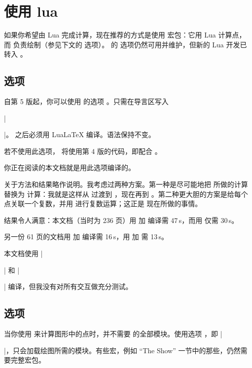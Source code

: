 \newpage
\section{使用 lua} \label{calc_with_lua}

如果你希望由 Lua 完成计算，现在推荐的方式是使用  宏包：它用 Lua 计算点，而 \tkzname{\tkznameofpack} 负责绘制（参见下文的  选项）。\tkzname{\tkznameofpack} 的  选项仍然可用并维护，但新的 Lua 开发已转入 。

\subsection{选项 } %
\label{ssub:option_code_lua}

自第 5 版起，你可以使用 \tkzname{\tkznameofpack} 的选项 。只需在导言区写入

 |\usepackage[lua]{tkz-euclide}|。
 之后必须用 LuaLaTeX 编译。语法保持不变。

若不使用此选项，\tkzname{\tkznameofpack} 将使用第 4 版的代码，即配合 。

你正在阅读的本文档就是用此选项编译的。

关于方法和结果略作说明。我考虑过两种方案。第一种是尽可能地把  所做的计算替换为  计算：我就是这样从  过渡到 ，现在再到 。第二种更大胆的方案是给每个点关联一个复数，并用  进行复数运算；这正是  现在所做的事情。

结果令人满意：本文档（当时为 236 页）用  加  编译需 47\,s，而用  仅需 30\,s。

另一份 61 页的文档用  加  编译需 16\,s，用  加  需 13\,s。

本文档使用 |\usepackage{tkz-base}| 和 |\usepackage[lua]{tkz-euclide}| 编译，但我没有对所有交互做充分测试。

\subsection{选项 } %
\label{ssub:option_code_mini}

当你使用  来计算图形中的点时，并不需要 \tkzname{\tkznameofpack} 的全部模块。使用选项 ，即 |\usepackage[mini]{tkz-euclide}|，只会加载绘图所需的模块。有些宏，例如 ``The Show'' 一节中的那些，仍然需要完整宏包。

\endinput
